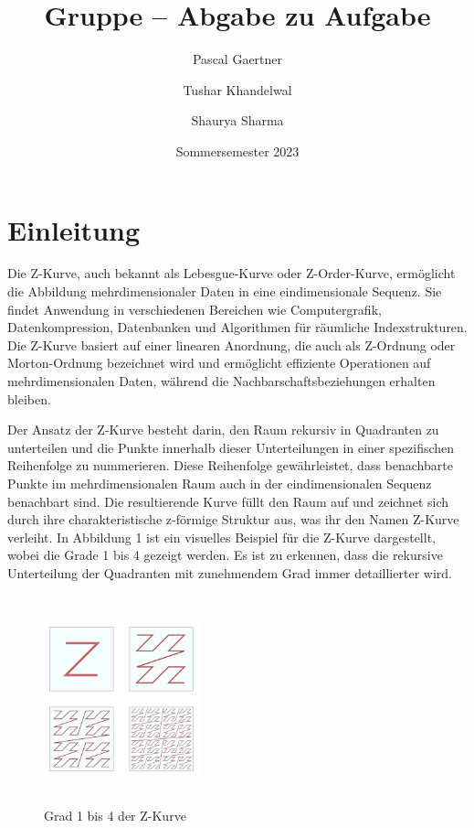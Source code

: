 \documentclass[course=erap]{aspdoc}
\author{Pascal Gaertner\and Tushar Khandelwal\and Shaurya Sharma}
\date{Sommersemester 2023}
\title{Gruppe \theGroup{} -- Abgabe zu Aufgabe \theNumber}
\begin{document}
\maketitle

\section{Einleitung}

\setlength{\parskip}{1em}
\noindent Die Z-Kurve, auch bekannt als Lebesgue-Kurve oder Z-Order-Kurve, ermöglicht die Abbildung mehrdimensionaler Daten in eine eindimensionale Sequenz. Sie findet Anwendung in verschiedenen Bereichen wie Computergrafik, Datenkompression, Datenbanken und Algorithmen für räumliche Indexstrukturen. Die Z-Kurve basiert auf einer linearen Anordnung, die auch als Z-Ordnung oder Morton-Ordnung bezeichnet wird und ermöglicht effiziente Operationen auf mehrdimensionalen Daten, während die Nachbarschaftsbeziehungen erhalten bleiben.
\setlength{\parskip}{1em}

\noindent Der Ansatz der Z-Kurve besteht darin, den Raum rekursiv in Quadranten zu unterteilen und die Punkte innerhalb dieser Unterteilungen in einer spezifischen Reihenfolge zu nummerieren. Diese Reihenfolge gewährleistet, dass benachbarte Punkte im mehrdimensionalen Raum auch in der eindimensionalen Sequenz benachbart sind. Die resultierende Kurve füllt den Raum auf und zeichnet sich durch ihre charakteristische z-förmige Struktur aus, was ihr den Namen Z-Kurve verleiht. In Abbildung 1 ist ein visuelles Beispiel für die Z-Kurve dargestellt, wobei die Grade 1 bis 4 gezeigt werden. Es ist zu erkennen, dass die rekursive Unterteilung der Quadranten mit zunehmendem Grad immer detaillierter wird.
\setlength{\parskip}{1em}

\begin{figure}[H]
        \centering
        \includegraphics[width=0.4\textwidth, height=6cm]{resources/z_kurve_grad_1_zu_4.png}
        \caption{Grad 1 bis 4 der Z-Kurve~\cite{eppstein}}
        \label{fig:Z-Kurve Grad 1 zu 4}
\end{figure}
\end{document}
